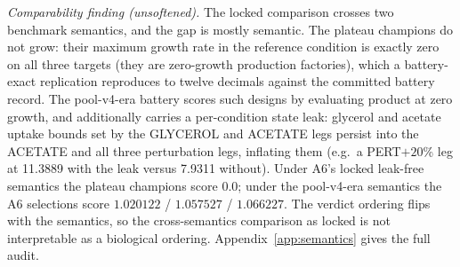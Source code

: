 \textit{Comparability finding (unsoftened).} The locked comparison crosses two benchmark semantics, and the gap is mostly semantic. The plateau champions do not grow: their maximum growth rate in the reference condition is exactly zero on all three targets (they are zero-growth production factories), which a battery-exact replication reproduces to twelve decimals against the committed battery record. The pool-v4-era battery scores such designs by evaluating product at zero growth, and additionally carries a per-condition state leak: glycerol and acetate uptake bounds set by the GLYCEROL and ACETATE legs persist into the ACETATE and all three perturbation legs, inflating them (e.g.\ a PERT$+20$\% leg at 11.3889 with the leak versus 7.9311 without). Under A6's locked leak-free semantics the plateau champions score $0.0$; under the pool-v4-era semantics the A6 selections score $1.020122$ / $1.057527$ / $1.066227$. The verdict ordering flips with the semantics, so the cross-semantics comparison as locked is not interpretable as a biological ordering. Appendix~\ref{app:semantics} gives the full audit.


\paragraph{} %
